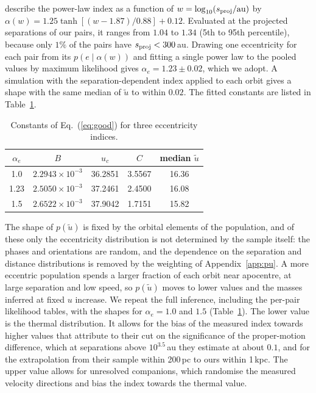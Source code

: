 \documentclass{aa}
\newcommand{\kmsau}{\mathrm{km}\,\mathrm{s}^{-1}\sqrt{\mathrm{AU}}}
\begin{document}
\begin{appendix}
\citet{Hwang2022Eccentricity} describe the power-law index as a function of $w=\log_{10}(s_{\rm proj}/\mathrm{au})$ by $\alpha(w)=1.25\tanh[(w-1.87)/0.88]+0.12$. Evaluated at the projected separations of our pairs, it ranges from $1.04$ to $1.34$ (5th to 95th percentile), because only $1\%$ of the pairs have $s_{\rm proj}<300$\,au. Drawing one eccentricity for each pair from its $p(e\mid\alpha(w))$ and fitting a single power law to the pooled values by maximum likelihood gives $\alpha_e=1.23\pm0.02$, which we adopt. A simulation with the separation-dependent index applied to each orbit gives a shape with the same median of $\widetilde u$ to within $0.02$. The fitted constants are listed in Table~\ref{tab:pu}.

\begin{table}
\caption{Constants of Eq.~(\ref{eq:good}) for three eccentricity indices.}
\label{tab:pu}
\centering
\begin{tabular}{ccccc}
\toprule
$\alpha_e$ & $B$ & $u_c$ & $C$ & median $\widetilde u$ \\
\midrule
1.0 & $2.2943\times10^{-3}$ & 36.2851 & 3.5567 & 16.36 \\
1.23 & $2.5050\times10^{-3}$ & 37.2461 & 2.4500 & 16.08 \\
1.5 & $2.6522\times10^{-3}$ & 37.9042 & 1.7151 & 15.82 \\
\bottomrule
\end{tabular}
\tablefoot{The adopted shape is $\alpha_e=1.23$. Medians in $\kmsau$.}
\end{table}

The shape of $p(\widetilde u)$ is fixed by the orbital elements of the population, and of these only the eccentricity distribution is not determined by the sample itself: the phases and orientations are random, and the dependence on the separation and distance distributions is removed by the weighting of Appendix~\ref{app:pu}. A more eccentric population spends a larger fraction of each orbit near apocentre, at large separation and low speed, so $p(\widetilde u)$ moves to lower values and the masses inferred at fixed $u$ increase. We repeat the full inference, including the per-pair likelihood tables, with the shapes for $\alpha_e=1.0$ and $1.5$ (Table~\ref{tab:pu}). The lower value is the thermal distribution. It allows for the bias of the measured index towards higher values that \citet{Hwang2022Eccentricity} attribute to their cut on the significance of the proper-motion difference, which at separations above $10^{3.5}$\,au they estimate at about $0.1$, and for the extrapolation from their sample within 200\,pc to ours within 1\,kpc. The upper value allows for unresolved companions, which randomise the measured velocity directions and bias the index towards the thermal value.


\end{appendix}
\end{document}
